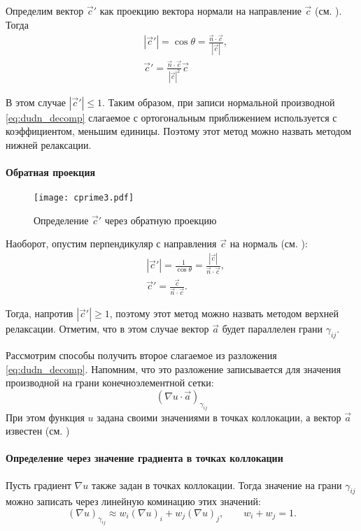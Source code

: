 Определим вектор $\vec c'$ как проекцию вектора нормали на направление $\vec c$ (см. ). Тогда
\begin{align*}
&|\vec c'| = \cos\theta = \frac{\vec n \cdot \vec c}{|\vec c|}, \\
&\vec c' = \frac{\vec n \cdot \vec c}{|\vec c|^2} \vec c
\end{align*}

В этом случае $|\vec c'| \leq 1$.
Таким образом, при записи нормальной производной \cref{eq:dudn_decomp} слагаемое с ортогональным приближением используется с коэффициентом, меньшим единицы.
Поэтому этот метод можно назвать методом нижней релаксации.

\paragraph{Обратная проекция}

\begin{figure}[h!]
\centering
\texttt{[image: cprime3.pdf]}
\caption{Определение $\vec c'$ через обратную проекцию}
\label{fig:cprime3}
\end{figure}

Наоборот, опустим перпендикуляр с направления $\vec c$ на нормаль (см. ):
\begin{align*}
&|\vec c'| = \frac{1}{\cos\theta} = \frac{|\vec c|}{\vec n \cdot \vec c}, \\
&\vec c' = \frac{\vec c}{\vec n \cdot \vec c}.
\end{align*}

Тогда, напротив $|\vec c'| \geq 1$, поэтому этот метод можно назвать методом верхней релаксации.
Отметим, что в этом случае вектор $\vec a$ будет параллелен грани $\gamma_{ij}$.

\label{sec:fvm_duda}
Рассмотрим способы получить второе слагаемое из разложения \cref{eq:dudn_decomp}.
Напомним, что это разложение записывается для значения производной на грани конечноэлементной сетки:
\begin{equation*}
\left(\nabla u \cdot \vec a\right)_{\gamma_{ij}}
\end{equation*}
При этом функция $u$ задана своими значениями в точках коллокации, а вектор $\vec a$ известен (см. )

\paragraph{Определение через значение градиента в точках коллокации}
Пусть градиент $\nabla u$ также задан в точках коллокации.
Тогда значение на грани $\gamma_{ij}$ 
можно записать через линейную коминацию этих значений:
\begin{equation*}
\left(\nabla u\right)_{\gamma_{ij}} \approx w_i \left(\nabla u\right)_i + w_j \left(\nabla u\right)_j, \qquad w_i + w_j = 1.
\end{equation*}

